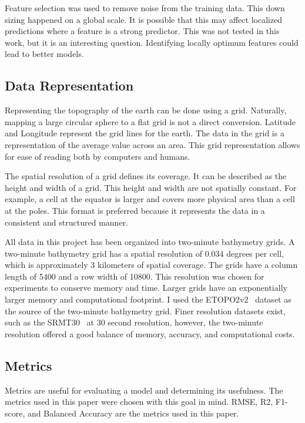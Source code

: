 \par
Feature selection was used to remove noise from the training data.
This down sizing happened on a global scale.
It is possible that this may affect localized predictions where a feature is a strong predictor.
This was not tested in this work, but it is an interesting question.
Identifying locally optimum features could lead to better models.


\subsection{Data Representation}
Representing the topography of the earth can be done using a grid. 
Naturally, mapping a large circular sphere to a flat grid is not a direct conversion.
Latitude and Longitude represent the grid lines for the earth.
The data in the grid is a representation of the average value across an area.
This grid representation allows for ease of reading both by computers and humans.

\par
The spatial resolution of a grid defines its coverage.
It can be described as the height and width of a grid.
This height and width are not spatially constant.
For example, a cell at the equator is larger and covers more physical area than a cell at the poles.
This format is preferred because it represents the data in a consistent and structured manner.

\par
All data in this project has been organized into two-minute bathymetry grids.
A two-minute bathymetry grid has a spatial resolution of 0.034 degrees per cell, which is approximately 3 kilometers of spatial coverage.
The grids have a column length of 5400 and a row width of 10800.
This resolution was chosen for experiments to conserve memory and time.
Larger grids have an exponentially larger memory and computational footprint.
I used the \ac{ETOPO}2v2~\cite{national1988etopo} dataset as the source of the two-minute bathymetry grid.
Finer resolution datasets exist, such as the SRMT30~\cite{becker2009global} at 30 second resolution, however, the two-minute resolution offered a good balance of memory, accuracy, and computational costs.

\subsection{Metrics}
Metrics are useful for evaluating a model and determining its usefulness.
The metrics used in this paper were chosen with this goal in mind.
RMSE, R2, F1-score, and Balanced Accuracy are the metrics used in this paper.

